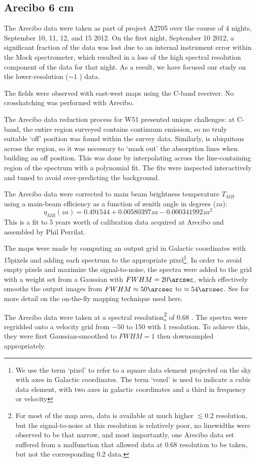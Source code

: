 \subsection{Arecibo 6 cm}
The Arecibo data were taken as part of project A2705 over the course of 4
nights, September 10, 11, 12, and 15 2012.  On the first night, September 10
2012, a significant fraction of the data was lost due to an internal instrument
error within the Mock spectrometer, which resulted in a loss of the
high spectral resolution component of the \formaldehyde data for that night.  As a
result, we have focused our study on the lower-resolution ($\sim1$ \kms) data.

The fields were observed with east-west maps using the C-band receiver.  No
crosshatching was performed with Arecibo.

The Arecibo data reduction process for W51
presented unique challenges: at C-band, the entire region surveyed contains
continuum emission, so no truly suitable `off' position was found within the
survey data.  Similarly, \formaldehyde is ubiquitous across the region, so it
was necessary to `mask out' the absorption lines when building an off position.
This was done by interpolating across the line-containing region of the
spectrum with a polynomial fit.  The fits were inspected interactively and
tuned to avoid over-predicting the background.

The Arecibo data were corrected to main beam brightness temperature $T_{MB}$
using a main-beam efficiency as a function of zenith angle in degrees ($za$):
$$\eta_{MB}(za) = 0.491544 + 0.00580397 za - 0.000341992 za^2$$
This is a fit to 5 years worth of calibration data acquired at Arecibo and
assembled by Phil Perrilat.


The maps were made by computing an output grid in Galactic coordinates with
15\arcsec pixels and adding each spectrum to the appropriate pixel\footnote{We
use the term `pixel' to refer to a square data element projected on the sky
with axes in Galactic coordinates.  The term `voxel' is used to indicate a cubic data
element, with two axes in galactic coordinates and a third in frequency or
velocity}.  In order
to avoid empty pixels and maximize the signal-to-noise, the spectra were added
to the grid with a weight set from a Gaussian with $FWHM=20\arcsec$, which
effectively smooths the output images from $FWHM\approx50\arcsec$ to
$\approx54\arcsec$.  See \citet{Mangum2007a} for more detail on the on-the-fly
mapping technique used here.

The Arecibo data were taken at a spectral resolution\footnote{For
most of the map area, data is available at much higher $\lesssim0.2$ \kms
resolution, but the signal-to-noise at this resolution is relatively poor, no
linewidths were observed to be that narrow, and most importantly, one Arecibo
data set suffered from a malfunction that allowed data at 0.68 \kms resolution
to be taken, but not the corresponding 0.2 \kms data.} of 0.68 \kms.  The
spectra were regridded onto a velocity grid from $-50$ to 150 \kms with 1 \kms
resolution.  To achieve this, they were first Gaussian-smoothed to $FWHM=1$
\kms then downsampled appropriately.

